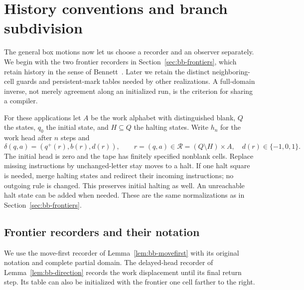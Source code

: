\section{History conventions and branch subdivision}\label{ba:codes}

The general box motions now let us choose a recorder and an observer
separately.  We begin with the two frontier recorders in
Section~\ref{sec:bb-frontiers}, which retain history in the
sense of Bennett~\cite{Bennett1973}.  Later we retain the distinct
neighboring-cell guards and persistent-mark tables needed by other
realizations.  A full-domain inverse, not merely agreement along an
initialized run, is the criterion for sharing a compiler.

For these applications let $A$ be the work alphabet with distinguished
blank, $Q$ the states, $q_0$ the initial state, and $H\subseteq Q$
the halting states.  Write $h_n$ for the work head after $n$ steps and
\[
 \delta(q,a)=(q^+(r),b(r),d(r)),\qquad
 r=(q,a)\in\mathcal R=(Q\setminus H)\times A,
 \quad d(r)\in\{-1,0,1\}.
\]
The initial head is zero and the tape has finitely specified nonblank
cells.  Replace missing instructions by unchanged-letter stay moves to
a halt.  If one halt square is needed, merge halting states and redirect
their incoming instructions; no outgoing rule is changed.  This preserves
initial halting as well.  An unreachable halt state can be added when
needed.  These are the same normalizations as in
Section~\ref{sec:bb-frontiers}.

\subsection{Frontier recorders and their notation}

We use the move-first recorder of Lemma~\ref{lem:bb-movefirst}
with its original notation and complete partial domain.
The delayed-head recorder of Lemma~\ref{lem:bb-direction} records the
work displacement until its final return step.  Its table can also be
initialized with the frontier one cell farther to the right.

